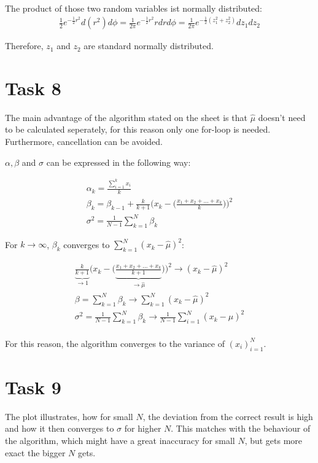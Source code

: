\documentclass[10pt,a4paper]{article}
\begin{document}
The product of those two random variables ist normally distributed:
\begin{align*}
\frac{1}{2}e^{-\frac{1}{2}r^2}d(r^2)d\phi = \frac{1}{2\pi}e^{-\frac{1}{2}r^2}rdrd\phi = \frac{1}{2\pi}e^{-\frac{1}{2}(z_1^2+z_2^2)}dz_1dz_2
\end{align*} 

Therefore, $z_1$ and $z_2$ are standard normally distributed.

\section*{Task 8}

The main advantage of the algorithm stated on the sheet is that $\hat{\mu}$ doesn't need to be calculated seperately, for this reason only one for-loop is needed. Furthermore, cancellation can be avoided.

$\alpha, \beta$ and $\sigma$ can be expressed in the following way:

\begin{gather*}
\alpha_k = \frac{\sum_{i=1}^k x_i}{k} \\
\beta_k = \beta_{k-1}+\frac{k}{k+1}\bigg(x_k-\bigg(\frac{x_1+x_2+...+x_{k}}{k}\bigg)\bigg)^2 \\
\sigma^2 = \frac{1}{N-1}\sum_{k=1}^N\beta_k
\end{gather*}

For $k \to \infty$, $\beta_k$ converges to $\sum_{k=1}^N (x_k-\hat{\mu})^2$:

\begin{gather*}
\underbrace{\frac{k}{k+1}}_{\to 1}\bigg(x_k-\bigg(\underbrace{\frac{x_1+x_2+...+x_{k}}{k+1}}_{\to \hat{\mu}}\bigg)\bigg)^2 \to (x_k-\hat{\mu})^2 \\
\beta = \sum_{k=1}^N \beta_k \to \sum_{k=1}^N (x_k-\hat{\mu})^2\\
\sigma^2 = \frac{1}{N-1}\sum_{k=1}^N\beta_k \to \frac{1}{N-1} \sum_{i=1}^N (x_k-\hat{\mu})^2 \\
\end{gather*}

For this reason, the algorithm converges to the variance of $(x_i)_{i=1}^N$.

\section*{Task 9}

The plot illustrates, how for small $N$, the deviation from the correct result is high and how it then converges to $\sigma$ for higher $N$. This matches with the behaviour of the algorithm, which might have a great inaccuracy for small $N$, but gets more exact the bigger $N$ gets.
\end{document}
